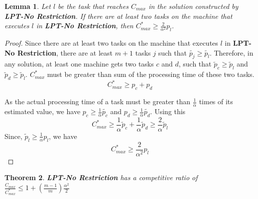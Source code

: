 \documentclass[10pt, conference, compsocconf]{IEEEtran}
\newtheorem{theorem}{Theorem}
\newtheorem{lemma}[theorem]{Lemma}
\begin{document}
\begin{lemma}\label{No Restriction}
  Let $l$ be the task that reaches $C_{max}$ in the solution
  constructed by \textbf{LPT-No Restriction}. If there are at least two
  tasks on the machine that executes $l$ in \textbf{LPT-No Restriction}, then 
  $C_{max}^* \geq {\frac{2}{\alpha^{2}}} p_l$.
\end{lemma}
\begin{proof}
  Since there are at least two tasks on the machine that executes $l$
  in \textbf{LPT-No Restriction}, there are at least $m+1$ tasks $j$
  such that $\tilde{p_j} \geq \tilde{p_l}$. Therefore, in any solution,
  at least one machine gets two tasks $c$ and $d$, such that $\tilde
  p_c \geq \tilde p_l$ and $\tilde p_d \geq \tilde p_l$. $C_{max}^{*}$
  must be greater than sum of the processing time of these two tasks.
   \begin{equation}\nonumber
    C_{max}^{*}\geq p_c + p_d
  \end{equation}	

  As the actual processing time of a task must be greater than
  $\frac{1}{\alpha}$ times of its estimated value, we have $p_c \geq
  \frac{1}{\alpha}\tilde{p_c}$ and $p_d \geq
  \frac{1}{\alpha}\tilde{p_d}$. Using this
  \begin{equation}\nonumber 
    C_{max}^{*} \geq \frac{1}{\alpha}\tilde p_c +  \frac{1}{\alpha} \tilde p_d \geq \frac{2}{\alpha}\tilde p_l
  \end{equation}
Since, $\tilde p_l \geq \frac{1}{\alpha} p_l$, we have
  \begin{equation}\nonumber
    C_{max}^{*} \geq {\frac{2}{\alpha^{2}}} p_l 
  \end{equation}
\end{proof}

\begin{theorem}
  \label{th:strategy2}
  \textbf{LPT-No Restriction} has a competitive ratio of
  $\frac{C_{max}}{C_{max}^{*}} \leq 1 + (\frac{m-1}{m})
  \frac{\alpha^{2}}{2}$
\end{theorem} 
\end{document}
